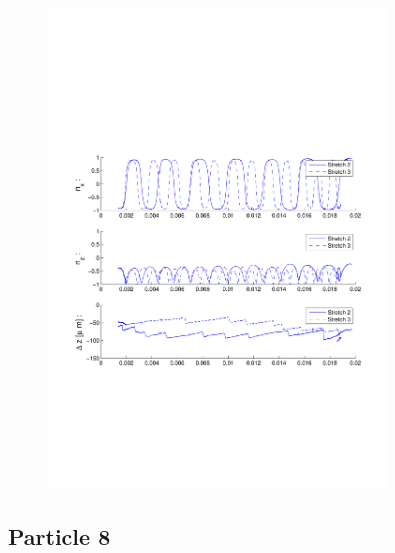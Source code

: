 \begin{figure}[H]

\centering

\includegraphics[width=0.8\textwidth]{Images/Particle 6/Stretch2.pdf}

\end{figure}

\subsection{Particle 8}


